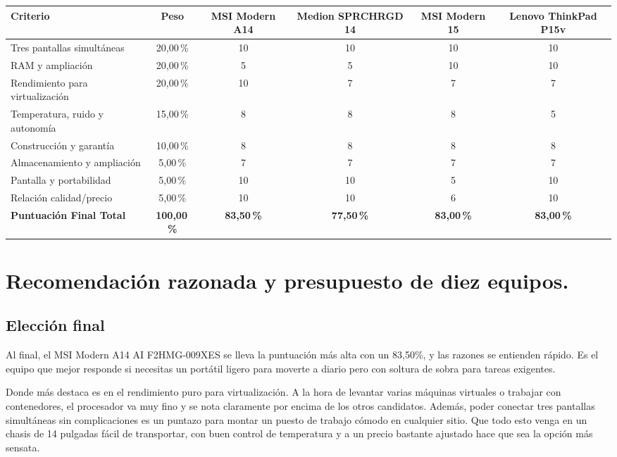 \documentclass[11.5pt]{article}
\begin{document}
	\begin{table}[H]
		\centering
		\footnotesize
		\renewcommand{\arraystretch}{1.25}
		\begin{tabularx}{\textwidth}{|l|c|c|c|c|c|}
			\hline
			\textbf{Criterio} & \textbf{Peso} & \textbf{MSI Modern A14} & \textbf{Medion SPRCHRGD 14} & \textbf{MSI Modern 15} & \textbf{Lenovo ThinkPad P15v} \\
			\hline
			Tres pantallas simultáneas & 20,00\,\% & 10 & 10 & 10 & 10 \\
			\hline
			RAM y ampliación & 20,00\,\% & 5 & 5 & 10 & 10 \\
			\hline
			Rendimiento para virtualización & 20,00\,\% & 10 & 7 & 7 & 7 \\
			\hline
			Temperatura, ruido y autonomía & 15,00\,\% & 8 & 8 & 8 & 5 \\
			\hline
			Construcción y garantía & 10,00\,\% & 8 & 8 & 8 & 8 \\
			\hline
			Almacenamiento y ampliación & 5,00\,\% & 7 & 7 & 7 & 7 \\
			\hline
			Pantalla y portabilidad & 5,00\,\% & 10 & 10 & 5 & 10 \\
			\hline
			Relación calidad/precio & 5,00\,\% & 10 & 10 & 6 & 10 \\
			\hline
			\textbf{Puntuación Final Total} & \textbf{100,00\,\%} & \textbf{83,50\,\%} & \textbf{77,50\,\%} & \textbf{83,00\,\%} & \textbf{83,00\,\%} \\
			\hline
		\end{tabularx}
	\end{table}

	
	\section{Recomendación razonada y presupuesto de diez equipos.}
	
	\subsection{Elección final}
	
	
	Al final, el MSI Modern A14 AI F2HMG-009XES se lleva la puntuación más alta con un 83,50\%, y las razones se entienden rápido. Es el equipo que mejor responde si necesitas un portátil ligero para moverte a diario pero con soltura de sobra para tareas exigentes.
	
	Donde más destaca es en el rendimiento puro para virtualización. A la hora de levantar varias máquinas virtuales o trabajar con contenedores, el procesador va muy fino y se nota claramente por encima de los otros candidatos. Además, poder conectar tres pantallas simultáneas sin complicaciones es un puntazo para montar un puesto de trabajo cómodo en cualquier sitio. Que todo esto venga en un chasis de 14 pulgadas fácil de transportar, con buen control de temperatura y a un precio bastante ajustado hace que sea la opción más sensata.
	
\end{document}

